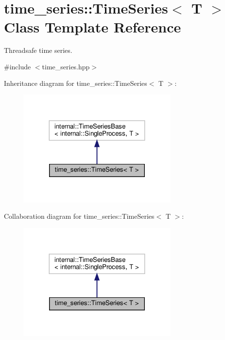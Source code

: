 \hypertarget{classtime__series_1_1TimeSeries}{}\section{time\+\_\+series\+:\+:Time\+Series$<$ T $>$ Class Template Reference}
\label{classtime__series_1_1TimeSeries}


Threadsafe time series.  




{\ttfamily \#include $<$time\+\_\+series.\+hpp$>$}



Inheritance diagram for time\+\_\+series\+:\+:Time\+Series$<$ T $>$\+:
\nopagebreak
\begin{figure}[H]
\begin{center}
\leavevmode
\includegraphics[width=227pt]{classtime__series_1_1TimeSeries__inherit__graph}
\end{center}
\end{figure}


Collaboration diagram for time\+\_\+series\+:\+:Time\+Series$<$ T $>$\+:
\nopagebreak
\begin{figure}[H]
\begin{center}
\leavevmode
\includegraphics[width=227pt]{classtime__series_1_1TimeSeries__coll__graph}
\end{center}
\end{figure}
